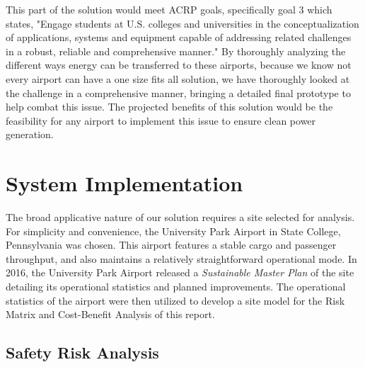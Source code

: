 \documentclass[../main.tex]{subfiles}
\begin{document}


This part of the solution would meet ACRP goals, specifically goal 3 which states, "Engage students at U.S. colleges and universities in the conceptualization of applications, systems and equipment capable of addressing related challenges in a robust, reliable and comprehensive manner." By thoroughly analyzing the different ways energy can be transferred to these airports, because we know not every airport can have a one size fits all solution, we have thoroughly looked at the challenge in a comprehensive manner, bringing a detailed final prototype to help combat this issue. The projected benefits of this solution would be the feasibility for any airport to implement this issue to ensure clean power generation.

\section{System Implementation}
The broad applicative nature of our solution requires a site selected for analysis. For simplicity and convenience, the University Park Airport in State College, Pennsylvania was chosen. This airport features a stable cargo and passenger throughput, and also maintains a relatively straightforward operational mode. In 2016, the University Park Airport released a \emph{Sustainable Master Plan} \cite{SCEplan} of the site detailing its operational statistics and planned improvements. The operational statistics of the airport were then utilized to develop a site model for the Risk Matrix and Cost-Benefit Analysis of this report.\par

\subsection{Safety Risk Analysis} %

\end{document}

